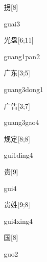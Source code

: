 \begin{verbete}[guai3]{拐}[8]
\begin{pronuncia}{guai3}
\end{pronuncia}
\end{verbete}

\begin{verbete}{光盘}[6;11]
\begin{pronuncia}{guang1pan2}
\end{pronuncia}
\end{verbete}

\begin{verbete}{广东}[3;5]
\begin{pronuncia}{guang3dong1}
\end{pronuncia}
\end{verbete}

\begin{verbete}{广告}[3;7]
\begin{pronuncia}{guang3gao4}
\end{pronuncia}
\end{verbete}

\begin{verbete}{规定}[8;8]
\begin{pronuncia}{gui1ding4}
\end{pronuncia}
\end{verbete}

\begin{verbete}[gui4]{贵}[9]
\begin{pronuncia}{gui4}
\end{pronuncia}
\end{verbete}

\begin{verbete}{贵姓}[9;8]
\begin{pronuncia}{gui4xing4}
\end{pronuncia}
\end{verbete}

\begin{verbete}[guo2]{国}[8]
\begin{pronuncia}{guo2}
\end{pronuncia}
\end{verbete}

